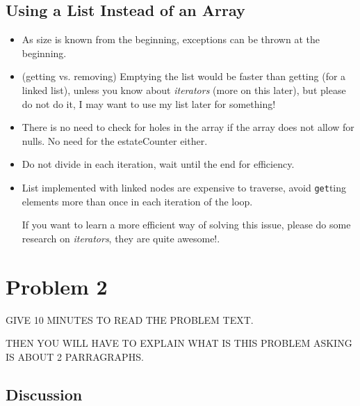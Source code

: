 \documentclass[a4paper, 9pt]{extarticle}
\begin{document}
\subsection{Using a List Instead of an Array}

\begin{multicols}{2}
\begin{itemize}

  \item As size is known from the beginning, exceptions can be thrown at the
    beginning.


  \item (getting vs. removing) Emptying the list would be faster than getting
    (for a linked list), unless you know about \emph{iterators} (more on this
    later), but please do not do it, I may want to use my list later for
    something!

  \item There is no need to check for holes in the array if the array does not
    allow for nulls. No need for the estateCounter either.

  \item Do not divide in each iteration, wait until the end for efficiency.

  \item List implemented with linked nodes are expensive to traverse, avoid
    \texttt{get}ting elements more than once in each iteration of the loop.

    If you want to learn a more efficient way of solving this issue, please do
    some research on \emph{iterators}, they are quite awesome!.

\end{itemize}
\columnbreak
{}
\end{multicols}







\section{Problem 2}

GIVE 10 MINUTES TO READ THE PROBLEM TEXT.

THEN YOU WILL HAVE TO EXPLAIN WHAT IS THIS PROBLEM ASKING IS ABOUT 2 PARRAGRAPHS.


\subsection{Discussion}
\end{document}
